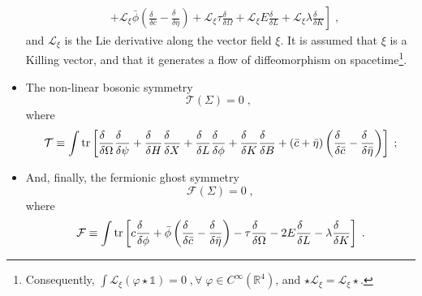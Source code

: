 \documentclass[../main.tex]{subfiles}
\begin{document}
\begin{itemize}
\begin{align}
                      & + \left. \mathcal{L}_\xi\bar{\phi}\left(\frac{\delta\phantom{\bar{c}}}{\delta\bar{c}}-\frac{\delta\phantom{\bar{\eta}}}{\delta\bar{\eta}}\right) + \mathcal{L}_\xi\tau\frac{\delta\phantom{\Omega}}{\delta\Omega}+\mathcal{L}_\xi E\frac{\delta\phantom{L}}{\delta L}+\mathcal{L}_\xi \lambda\frac{\delta\phantom{K}}{\delta K}\right] \;,
        \end{align}
        and $ \mathcal{L}_{\xi} $ is the Lie derivative along the vector field $ \xi $. It is assumed that $\xi$ is a Killing vector, and that it generates a flow of diffeomorphism on spacetime\footnote{Consequently, $\int \mathcal{L}_{\xi} \left( \varphi \star \mathds{1} \right) = 0 \;, \forall \; \varphi \in C^{ \infty }\left( \mathbb{R}^4 \right)$, and $ \star \mathcal{L}_\xi = \mathcal{L}_\xi \star $.}.
  \item  The non-linear bosonic symmetry
        \begin{equation}
          \label{eq:nl-bosonic-eq}
          \mathcal{T}\left(\Sigma\right)=0\;,
          \;
        \end{equation}
        where
        \begin{equation}
          \label{eq:t-operator}
          \mathcal{T} \equiv \int \tr \left[\frac{\delta\phantom{\Omega}}{\delta \Omega}\frac{\delta\phantom{\psi}}{\delta \psi} + \frac{\delta\phantom{H}}{\delta H}\frac{\delta\phantom{X}}{\delta X}+\frac{\delta\phantom{L}}{\delta L}\frac{\delta\phantom{\phi}}{\delta \phi}+\frac{\delta\phantom{K}}{\delta K}\frac{\delta\phantom{B}}{\delta B}+\left(\bar{c}+\bar{\eta}\right)\left(\frac{\delta\phantom{\bar{c}}}{\delta\bar{c}}-\frac{\delta\phantom{\bar{\eta}}}{\delta\bar{\eta}}\right)\right] \;;
        \end{equation}
  \item And, finally, the fermionic ghost symmetry
        \begin{equation}
          \label{eq:fermionicghostsymmetry}
          \mathcal{F}\left(\Sigma\right)=0 \;,
        \end{equation}
        where
        \begin{equation}
          \label{eq:fermionicghostop}
          \mathcal{F} \equiv \int \tr \left[c\frac{\delta\phantom{\phi}}{\delta \phi}+\bar{\phi}\left(\frac{\delta\phantom{\bar{c}}}{\delta\bar{c}}-\frac{\delta\phantom{\bar{\eta}}}{\delta\bar{\eta}}\right)-\tau\frac{\delta\phantom{\Omega}}{\delta \Omega}-2E\frac{\delta\phantom{L}}{\delta L}-\lambda\frac{\delta\phantom{K}}{\delta K}\right] \;.
        \end{equation}
\end{itemize}
\end{document}
